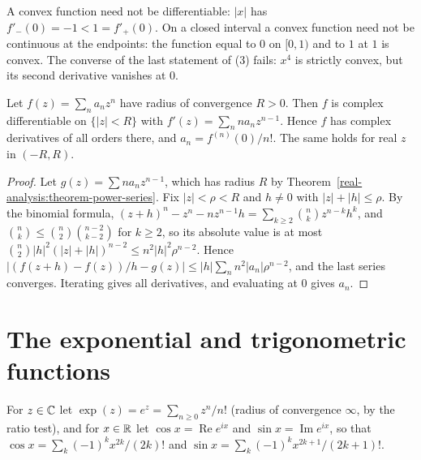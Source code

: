 \begin{counterexample}\label{real-analysis:counterexample-convex}
A convex function need not be differentiable: $|x|$ has $f'_-(0) = -1 < 1 = f'_+(0)$. On a closed interval a convex function need not be continuous at the endpoints: the function equal to $0$ on $[0, 1)$ and to $1$
at $1$ is convex. The converse of the last statement of (3) fails: $x^4$ is strictly convex, but its second derivative vanishes at $0$.
\end{counterexample}

\begin{theorem}\label{real-analysis:theorem-power-series-derivative}
Let $f(z) = \sum_na_nz^n$ have radius of convergence $R > 0$. Then $f$ is complex differentiable on $\{|z| < R\}$ with $f'(z) = \sum_nna_nz^{n-1}$. Hence $f$ has complex derivatives of all
orders there, and $a_n = f^{(n)}(0)/n!$. The same holds for real $z$ in $(-R, R)$.
\end{theorem}

\begin{proof}
Let $g(z) = \sum na_nz^{n-1}$, which has radius $R$ by Theorem~\ref{real-analysis:theorem-power-series}. Fix $|z| < \rho < R$ and $h \neq 0$ with $|z| + |h| \leq \rho$. By the binomial formula,
$(z + h)^n - z^n - nz^{n-1}h = \sum_{k \geq 2}\binom{n}{k}z^{n-k}h^k$, and $\binom{n}{k} \leq \binom{n}{2}\binom{n-2}{k-2}$ for $k \geq 2$, so its absolute value is at most
$\binom{n}{2}|h|^2(|z| + |h|)^{n-2} \leq n^2|h|^2\rho^{n-2}$. Hence
$|(f(z + h) - f(z))/h - g(z)| \leq |h|\sum_n n^2|a_n|\rho^{n-2}$, and the last series converges. Iterating gives all derivatives, and evaluating at $0$ gives $a_n$.
\end{proof}

\section{The exponential and trigonometric functions}\label{real-analysis:section-exponential}

\begin{definition}\label{real-analysis:definition-exponential}
For $z \in \mathbb{C}$ let $\exp(z) = e^z = \sum_{n \geq 0}z^n/n!$ (radius of convergence $\infty$, by the ratio test), and for $x \in \mathbb{R}$ let $\cos x = \operatorname{Re} e^{ix}$ and
$\sin x = \operatorname{Im} e^{ix}$, so that $\cos x = \sum_k(-1)^kx^{2k}/(2k)!$ and $\sin x = \sum_k(-1)^kx^{2k+1}/(2k+1)!$.
\end{definition}

